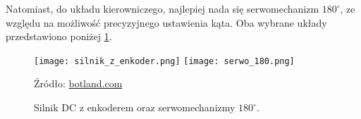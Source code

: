             Natomiast, do układu kierowniczego, najlepiej nada się serwomechanizm $180^\circ$, ze względu na możliwość precyzyjnego ustawienia kąta. Oba wybrane układy przedstawiono poniżej \ref{fig:engines}.
            \begin{figure}[!ht]
                \centering
                \texttt{[image: silnik\_z\_enkoder.png]}
                \texttt{[image: serwo\_180.png]}

                \caption{Silnik DC z enkoderem oraz serwomechanizmy $180^\circ$.}
                \footnotesize{Źródło: \href{https://botland.com.pl/}{botland.com}}
                \label{fig:engines}
            \end{figure}

